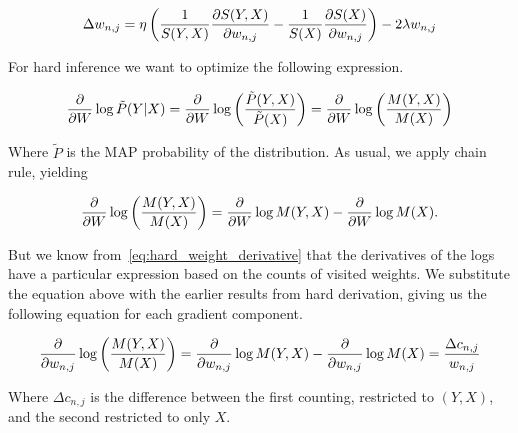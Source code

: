 \begin{equation}
  \Delta w_{n,j}=\eta\left(\frac{1}{S(Y,X)}\frac{\partial S(Y,X)}{\partial w_{n,j}}-\frac{1}{S(X)}
    \frac{\partial S(X)}{\partial w_{n,j}}\right)-2\lambda w_{n,j}
\end{equation}

For hard inference we want to optimize the following expression.

\begin{equation*}
  \frac{\partial}{\partial W}\log\tilde{P}(Y|X)=\frac{\partial}{\partial W}\log\left(\frac{\tilde{P}(Y,X)}{\tilde{P}(X)}\right)=
    \frac{\partial}{\partial W}\log\left(\frac{M(Y,X)}{M(X)}\right)
\end{equation*}

Where $\tilde{P}$ is the MAP probability of the distribution. As usual, we apply chain rule,
yielding

\begin{equation*}
  \frac{\partial}{\partial W}\log\left(\frac{M(Y,X)}{M(X)}\right)=\frac{\partial}{\partial W}\log M(Y,X)-\frac{\partial}{\partial W}\log M(X).
\end{equation*}

But we know from~\autoref{eq:hard_weight_derivative} that the derivatives of the logs have a
particular expression based on the counts of visited weights. We substitute the equation above with
the earlier results from hard derivation, giving us the following equation for each gradient
component.

\begin{equation*}
  \frac{\partial}{\partial w_{n,j}}\log\left(\frac{M(Y,X)}{M(X)}\right)=\frac{\partial}{\partial w_{n,j}}\log M(Y,X)-
  \frac{\partial}{\partial w_{n,j}}\log M(X)=\frac{\Delta c_{n,j}}{w_{n,j}}
\end{equation*}

Where $\Delta c_{n,j}$ is the difference between the first counting, restricted to $(Y,X)$, and the
second restricted to only $X$.

